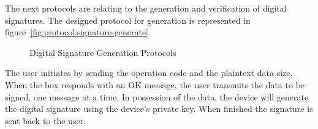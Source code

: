 The next protocols are relating to the generation and verification of digital signatures.
The designed protocol for generation is represented in figure~\ref{fig:protocol:signature-generate}.
\begin{figure}[h!]
	\centering     %
	\caption{Digital Signature Generation Protocols}
\end{figure}

The user initiates by sending the operation code and the plaintext data size.
When the box responds with an OK message, the user transmits the data to be signed, one message at a time.
In possession of the data, the device will generate the digital signature using the device's private key. When finished the signature is sent back to the user.

